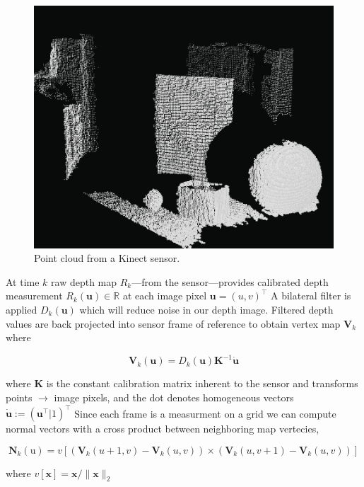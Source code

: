 \documentclass[10pt, twocolumn]{article}
\begin{document}
\begin{figure}
  \centering
  \includegraphics[width=0.8\linewidth]{pointcloud}
  \caption{Point cloud from a Kinect sensor.}
  \label{fig:pointcloud}
\end{figure}



At time $k$ raw depth map $R_k$---from the sensor---provides calibrated depth measurement $R_k(\mathbf{u}) \in \mathbb{R}$ at each image pixel $\mathbf{u} = (u,v)^{\top}$
A bilateral filter is applied $D_k(\mathbf{u})$ which will reduce noise in our depth image.
Filtered depth values are back projected into sensor frame of reference to obtain vertex map $\mathbf{V}_k$ where 

\begin{equation}
\mathbf{V}_k(\mathbf{u}) = D_k(\mathbf{u})\mathbf{K}^{-1}\dot{\mathbf{u}}
\end{equation}

where $\mathbf{K}$ is the constant calibration matrix inherent to the sensor and transforms points $\rightarrow$ image pixels, and the dot denotes homogeneous vectors $\mathbf{\dot{u}} := (\mathbf{u}^{\top}|1)^{\top}$
Since each frame is a measurment on a grid we can compute normal vectors with a cross product between neighboring map vertecies,

\begin{equation}
\mathbf{N}_k(\mathrm{u}) = v[(\mathbf{V}_k(u+1,v) - \mathbf{V}_k(u, v)) \times (\mathbf{V}_k(u,v+1) - \mathbf{V}_k(u,v))]
\end{equation}

 where $v[\mathbf{x}] = \mathbf{x} / \| \mathbf{x} \|_{2}$
\end{document}
